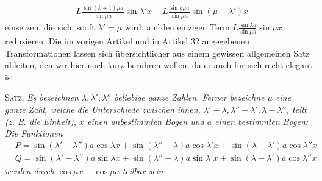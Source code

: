 \[
\begin{aligned}
&L\frac{\sin(k+1)\mu a}{\sin\mu a}\sin\lambda'x+L\frac{\sin k\mu a}{\sin\mu a}\sin(\mu-\lambda')x
\end{aligned}
\]
einsetzen, die sich, sooft $\lambda'=\mu$ wird, auf den einzigen Term $L\frac{\sin\lambda a}{\sin\mu a}\sin\mu x$ reduzieren.
Die im vorigen Artikel und in Artikel 32 angegebenen Transformationen lassen sich übersichtlicher aus einem gewissen allgemeinen Satz ableiten, den wir hier noch kurz berühren wollen, da er auch für sich recht elegant ist.

\textsc{Satz.} \textit{Es bezeichnen $\lambda,\lambda',\lambda''$ beliebige ganze Zahlen. Ferner bezeichne $\mu$ eine ganze Zahl, welche die Unterschiede zwischen ihnen, $\lambda'-\lambda,\lambda''-\lambda',\lambda-\lambda''$, teilt (z. B. die Einheit), $x$ einen unbestimmten Bogen und $a$ einen bestimmten Bogen: Die Funktionen}
\[
\begin{aligned}
&P=\sin(\lambda'-\lambda'')a\cos\lambda x+\sin(\lambda''-\lambda)a\cos\lambda'x+\sin(\lambda-\lambda')a\cos\lambda''x\\[5pt]
&Q=\sin(\lambda'-\lambda'')a\sin\lambda x+\sin(\lambda''-\lambda)a\sin\lambda'x+\sin(\lambda-\lambda')a\cos\lambda''x
\end{aligned}
\]
\textit{werden durch} $\cos\mu x-\cos\mu a$ \textit{teilbar sein.}

